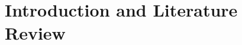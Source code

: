 \section[Introduction and Literature Review]{Introduction and Literature Review}
\label{sec:introduction}

\lipsum[2]

